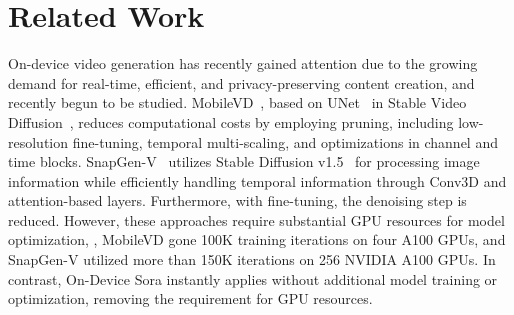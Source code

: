 \section{Related Work}

On-device video generation has recently gained attention due to the growing demand for real-time, efficient, and privacy-preserving content creation, and recently begun to be studied. MobileVD~\cite{yahia2024mobile}, based on UNet~\cite{ronneberger2015u} in Stable Video Diffusion~\cite{blattmann2023stable}, reduces computational costs by employing pruning, including low-resolution fine-tuning, temporal multi-scaling, and optimizations in channel and time blocks. SnapGen-V~\cite{wu2024snapgen} utilizes Stable Diffusion v1.5~\cite{rombach2022high} for processing image information while efficiently handling temporal information through Conv3D and attention-based layers. Furthermore, with fine-tuning, the denoising step is reduced. However, these approaches require substantial GPU resources for model optimization, \eg, MobileVD gone 100K training iterations on four A100 GPUs, and SnapGen-V utilized more than 150K iterations on 256 NVIDIA A100 GPUs. In contrast, On-Device Sora instantly applies without additional model training or optimization, removing the requirement for GPU resources.
